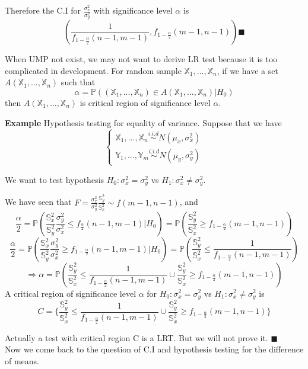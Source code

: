 Therefore the C.I for $\frac{\sigma_x^2}{\sigma_y^2}$ with significance level $\alpha$ is
$$ (\frac{1}{f_{1-\frac{\alpha}{2}}(n-1, m-1)} , f_{1-\frac{\alpha}{2}}(m-1, n-1)) \blacksquare$$

When UMP not exist, we may not want to derive LR test because it is too complicated in development. For random sample $\mathbb{X}_1, ..., \mathbb{X}_n$, if we have a set  $A(\mathbb{X}_1, ..., \mathbb{X}_n)$ such that 
$$\alpha = \mathbb{P}((\mathbb{X}_1, ..., \mathbb{X}_n) \in A(\mathbb{X}_1, ..., \mathbb{X}_n) | H_0)$$
then $A(\mathbb{X}_1, ..., \mathbb{X}_n)$ is critical region of significance level $\alpha$.

\textbf{Example} Hypothesis testing for equality of variance.
Suppose that we have
$$\begin{cases}
\mathbb{X}_1, ..., \mathbb{X}_n \overset{i.i.d}{\sim} N(\mu_x, \sigma_x^2) \\
\mathbb{Y}_1, ..., \mathbb{Y}_m \overset {i.i.d}{\sim} N(\mu_y, \sigma_y^2)
\end{cases}$$

We want to test hypothesis $H_0: \sigma_x^2 = \sigma_y^2$ vs $H_1: \sigma_x^2 \neq \sigma_y^2$.

We have seen that $F = \frac{\sigma_x^2}{\sigma_y^2}\frac{\mathbb{S}_y^2}{\mathbb{S}_x^2} \sim f(m-1, n-1)$, and
$$\frac{\alpha}{2} = \mathbb{P}(\frac{\mathbb{S}_x^2}{\mathbb{S}_y^2} \frac{\sigma_y^2}{\sigma_x^2} \leq f_{\frac{\alpha}{2}}(n-1, m-1) | H_0)
= \mathbb{P}(\frac{\mathbb{S}_y^2}{\mathbb{S}_x^2} \geq f_{1-\frac{\alpha}{2}}(m-1, n-1))$$
$$\frac{\alpha}{2} = \mathbb{P}(\frac{\mathbb{S}_x^2}{\mathbb{S}_y^2} \frac{\sigma_y^2}{\sigma_x^2} \geq f_{1-\frac{\alpha}{2}}(n-1, m-1) | H_0)
= \mathbb{P}(\frac{\mathbb{S}_y^2}{\mathbb{S}_x^2} \leq \frac{1}{f_{1-\frac{\alpha}{2}}(n-1, m-1)})$$
$$\Rightarrow \alpha = \mathbb{P}(\frac{\mathbb{S}_y^2}{\mathbb{S}_x^2} \leq \frac{1}{f_{1-\frac{\alpha}{2}}(n-1, m-1)} \cup \frac{\mathbb{S}_y^2}{\mathbb{S}_x^2} \geq f_{1-\frac{\alpha}{2}}(m-1, n-1))$$
A critical region of significance level $\alpha$ for $H_0: \sigma_x^2 = \sigma_y^2$ vs $H_1: \sigma_x^2 \neq \sigma_y^2$ is
$$C = \Big\{ \frac{\mathbb{S}_y^2}{\mathbb{S}_x^2} \leq \frac{1}{f_{1-\frac{\alpha}{2}}(n-1, m-1)} \cup \frac{\mathbb{S}_y^2}{\mathbb{S}_x^2} \geq f_{1-\frac{\alpha}{2}}(m-1, n-1) \Big\}$$

Actually a test with critical region C is a LRT. But we will not prove it. $\blacksquare$\\

Now we come back to the question of C.I and hypothesis testing for the difference of means.



